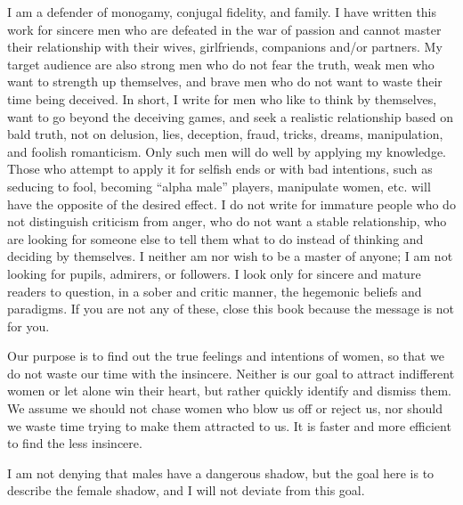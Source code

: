 \par I am a defender of monogamy, conjugal fidelity, and family. I have written this work for sincere men who are defeated in the war of passion and cannot master their relationship with their wives, girlfriends, companions and/or partners. My target audience are also strong men who do not fear the truth, weak men who want to strength up themselves, and brave men who do not want to waste their time being deceived. In short, I write for men who like to think by themselves, want to go beyond the deceiving games, and seek a realistic relationship based on bald truth, not on delusion, lies, deception, fraud, tricks, dreams, manipulation, and foolish romanticism. Only such men will do well by applying my knowledge. Those who attempt to apply it for selfish ends or with bad intentions, such as seducing to fool, becoming \enquote{alpha male} players, manipulate women, etc. will have the opposite of the desired effect. I do not write for immature people who do not distinguish criticism from anger, who do not want a stable relationship, who are looking for someone else to tell them what to do instead of thinking and deciding by themselves. I neither am nor wish to be a master of anyone; I am not looking for pupils, admirers, or followers. I look only for sincere and mature readers to question, in a sober and critic manner, the hegemonic beliefs and paradigms. If you are not any of these, close this book because the message is not for you.

\par Our purpose is to find out the true feelings and intentions of women, so that we do not waste our time with the insincere. Neither is our goal to attract indifferent women or let alone win their heart, but rather quickly identify and dismiss them. We assume we should not chase women who blow us off or reject us, nor should we waste time trying to make them attracted to us. It is faster and more efficient to find the less insincere.

\par I am not denying that males have a dangerous shadow\footnotemark[6], but the goal here is to describe the female shadow, and I will not deviate from this goal.

